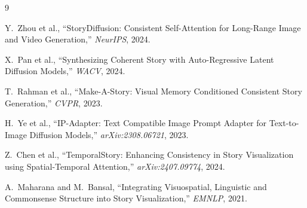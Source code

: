 \documentclass[11pt]{article}
\begin{document}

\begin{thebibliography}{9}

Y.~Zhou et al., ``StoryDiffusion: Consistent Self-Attention for Long-Range Image and Video Generation,'' \emph{NeurIPS}, 2024.

X.~Pan et al., ``Synthesizing Coherent Story with Auto-Regressive Latent Diffusion Models,'' \emph{WACV}, 2024.

T.~Rahman et al., ``Make-A-Story: Visual Memory Conditioned Consistent Story Generation,'' \emph{CVPR}, 2023.

H.~Ye et al., ``IP-Adapter: Text Compatible Image Prompt Adapter for Text-to-Image Diffusion Models,'' \emph{arXiv:2308.06721}, 2023.

Z.~Chen et al., ``TemporalStory: Enhancing Consistency in Story Visualization using Spatial-Temporal Attention,'' \emph{arXiv:2407.09774}, 2024.

A.~Maharana and M.~Bansal, ``Integrating Visuospatial, Linguistic and Commonsense Structure into Story Visualization,'' \emph{EMNLP}, 2021.

\end{thebibliography}
\end{document}
